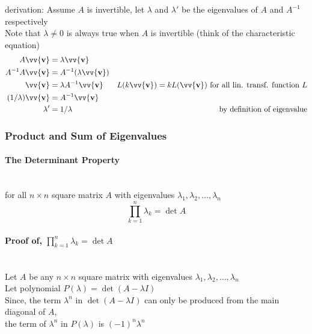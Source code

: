 \documentclass[11pt]{article}
\DeclareRobustCommand{\myvec}[1]{\vv{\mathbf{#1}}}
\newcommand{\mymat}[1]{#1}
\begin{document}
    derivation: Assume $\mymat{A}$ is invertible, let $\lambda$ and $\lambda'$ be the eigenvalues of $\mymat{A}$ and $\mymat{A}^{-1}$ respectively\\
    Note that $\lambda \ne 0$ is always true when $\mymat{A}$ is invertible (think of the characteristic equation)
    \begin{align*}
        \mymat{A}\myvec{v} &= \lambda\myvec{v} \\
        \mymat{A}^{-1} \mymat{A} \myvec{v} &= \mymat{A}^{-1} (\lambda \myvec{v}) \\
        \myvec{v} &= \lambda \mymat{A}^{-1} \myvec{v} & \mymat{L}(k\myvec{v}) = k\mymat{L}(\myvec{v}) \text{ for all lin. transf. function }\mymat{L}\\
        (1/\lambda)\myvec{v} &= \mymat{A}^{-1} \myvec{v}\\
        \lambda' &= 1/\lambda & \text{by definition of eigenvalue}
    \end{align*}
    \subsubsection{Product and Sum of Eigenvalues}
    \paragraph{The Determinant Property}~\\
    for all $n \times n$ square matrix $\mymat{A}$ with eigenvalues $\lambda_1, \lambda_2, \dots, \lambda_n$
    \begin{equation}
        \prod_{k=1}^{n} \lambda_k = \det \mymat{A}
    \end{equation}

    \paragraph{Proof of, $\prod_{k=1}^{n} \lambda_k = \det \mymat{A}$}~\vspace{1ex}\\
    Let $\mymat{A}$ be any $n \times n$ square matrix with eigenvalues $\lambda_1, \lambda_2, \dots, \lambda_n$ \\
    Let polynomial $P(\lambda) = \det(\mymat{A} - \lambda\mymat{I})$ \vspace{1ex}\\
    
    Since, the term $\lambda^n$ in $\det(\mymat{A} - \lambda\mymat{I})$ can only be produced from the main diagonal of $\mymat{A}$, \\
    the term of $\lambda^n$ in $P(\lambda)$ is $(-1)^n\lambda^n$ \vspace{1ex} \\
\end{document}

